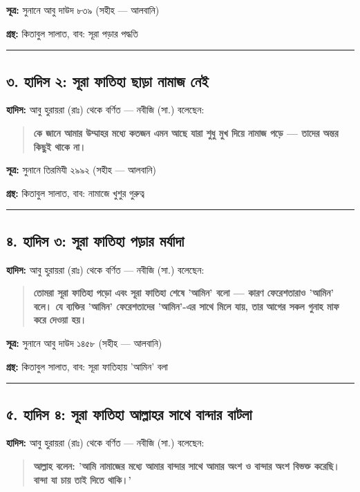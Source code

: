 \textbf{সূত্র:} সুনানে আবু দাউদ ৮৩৯ (সহীহ — আলবানি)

\textbf{গ্রন্থ:} কিতাবুল সালাত, বাব: সূরা পড়ার পদ্ধতি

\medskip\hrule\medskip

\subsection*{৩. হাদিস ২: সূরা ফাতিহা ছাড়া নামাজ নেই}

\textbf{হাদিস:} আবু হুরায়রা (রাঃ) থেকে বর্ণিত — নবীজি (সা.) বলেছেন:

\begin{quote}
\textbf{কে জানে আমার উম্মাহর মধ্যে কতজন এমন আছে যারা শুধু মুখ দিয়ে নামাজ পড়ে — তাদের অন্তর কিছুই থাকে না।}
\end{quote}

\textbf{সূত্র:} সুনানে তিরমিযী ২৯৯২ (সহীহ — আলবানি)

\textbf{গ্রন্থ:} কিতাবুল সালাত, বাব: নামাজে খুশুর গুরুত্ব

\medskip\hrule\medskip

\subsection*{৪. হাদিস ৩: সূরা ফাতিহা পড়ার মর্যাদা}

\textbf{হাদিস:} আবু হুরায়রা (রাঃ) থেকে বর্ণিত — নবীজি (সা.) বলেছেন:

\begin{quote}
\textbf{তোমরা সূরা ফাতিহা পড়ো এবং সূরা ফাতিহা শেষে 'আমিন' বলো — কারণ ফেরেশতারাও 'আমিন' বলে। যে ব্যক্তির 'আমিন' ফেরেশতাদের 'আমিন'-এর সাথে মিলে যায়, তার আগের সকল গুনাহ মাফ করে দেওয়া হয়।}
\end{quote}

\textbf{সূত্র:} সুনানে আবু দাউদ ১৪৫৮ (সহীহ — আলবানি)

\textbf{গ্রন্থ:} কিতাবুল সালাত, বাব: সূরা ফাতিহায় 'আমিন' বলা

\medskip\hrule\medskip

\subsection*{৫. হাদিস ৪: সূরা ফাতিহা আল্লাহর সাথে বান্দার বাটলা}

\textbf{হাদিস:} আবু হুরায়রা (রাঃ) থেকে বর্ণিত — নবীজি (সা.) বলেছেন:

\begin{quote}
\textbf{আল্লাহ বলেন: 'আমি নামাজের মধ্যে আমার বান্দার সাথে আমার অংশ ও বান্দার অংশ বিভক্ত করেছি। বান্দা যা চায় তাই দিতে থাকি।'}
\end{quote}

